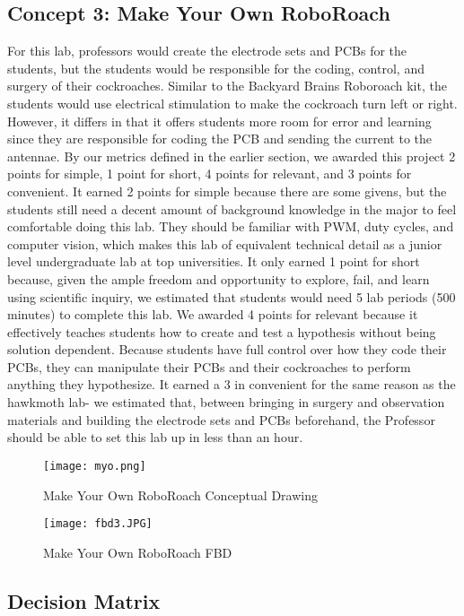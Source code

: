 \documentclass{article}
\begin{document}
\subsection{Concept 3: Make Your Own RoboRoach}
 For this lab, professors would create the electrode sets and PCBs for the students, but the students would be responsible for the coding, control, and surgery of their cockroaches. Similar to the Backyard Brains Roboroach kit, the students would use electrical stimulation to make the cockroach turn left or right. However, it differs in that it offers students more room for error and learning since they are responsible for coding the PCB and sending the current to the antennae. By our metrics defined in the earlier section, we awarded this project 2 points for simple, 1 point for short, 4 points for relevant, and 3 points for convenient. It earned 2 points for simple because there are some givens, but the students still need a decent amount of background knowledge in the major to feel comfortable doing this lab. They should be familiar with PWM, duty cycles, and computer vision, which makes this lab of equivalent technical detail as a junior level undergraduate lab at top universities. It only earned 1 point for short because, given the ample freedom and opportunity to explore, fail, and learn using scientific inquiry, we estimated that students would need 5 lab periods (500 minutes) to complete this lab. We awarded 4 points for relevant because it effectively teaches students how to create and test a hypothesis without being solution dependent. Because students have full control over how they code their PCBs, they can manipulate their PCBs and their cockroaches to perform anything they hypothesize. It earned a 3 in convenient for the same reason as the hawkmoth lab- we estimated that, between bringing in surgery and observation materials and building the electrode sets and PCBs beforehand, the Professor should be able to set this lab up in less than an hour.

\begin{figure}[ht!]
\centering
\texttt{[image: myo.png]}
\caption{Make Your Own RoboRoach Conceptual Drawing}
\label{fig:concept3}
\end{figure}

\begin{figure}[ht!]
\centering
\texttt{[image: fbd3.JPG]}
\caption{Make Your Own RoboRoach FBD}
\label{fig:FBD3}
\end{figure}

\subsection{Decision Matrix}
\end{document}
